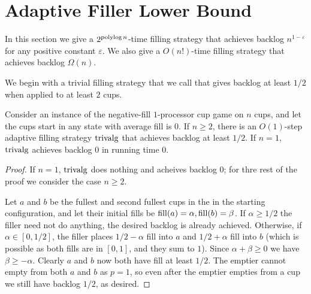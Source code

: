 \section{Adaptive Filler Lower Bound}\label{sec:adaptive}

In this section we give a $2^{\operatorname{\text{polylog}} n}$-time filling strategy
that achieves backlog $n^{1 - \varepsilon}$ for any positive
constant $\varepsilon$. 
We also give a $O(n!)$-time filling strategy that achieves
backlog $\Omega(n)$.

We begin with a trivial filling strategy that we call
 that gives backlog at least $1/2$ when applied
to at least $2$ cups.
\begin{proposition}
  \label{prop:adaptiveBase}
  Consider an instance of the negative-fill $1$-processor cup
  game on $n$ cups, and let the cups start in any state with
  average fill is $0$. If $n\ge 2$, there is an $O(1)$-step
  adaptive filling strategy $\operatorname{\text{\textup{trivalg}}}$ that achieves backlog at
  least $1/2$. If $n=1$, $\operatorname{\text{\textup{trivalg}}}$ achieves backlog $0$ in
  running time $0$.
\end{proposition}
\begin{proof}
  If $n=1$, $\operatorname{\text{\textup{trivalg}}}$ does nothing and acheives backlog $0$; for
  thre rest of the proof we consider the case $n\ge 2$.

  Let $a$ and $b$ be the fullest and second fullest cups in the in
  the starting configuration, and let their initial fills be
  $\operatorname{\text{\textup{fill}}}(a) = \alpha, \operatorname{\text{\textup{fill}}}(b) = \beta$. 
  If $\alpha\ge 1/2$ the filler need not do anything, the desired
  backlog is already achieved.
  Otherwise, if $\alpha \in [0, 1/2]$, the filler places
  $1/2-\alpha$ fill into $a$ and $1/2 + \alpha$ fill into $b$
  (which is possible as both fills are in $[0,1]$, and they sum
  to $1$). Since $\alpha + \beta \ge 0$ we have $\beta \ge -\alpha$.
  Clearly $a$ and $b$ now both have fill at least $1/2$.
  The emptier cannot empty from both $a$ and $b$ as $p=1$, so
  even after the emptier empties from a cup we still have backlog
  $1/2$, as desired.
\end{proof}

  
